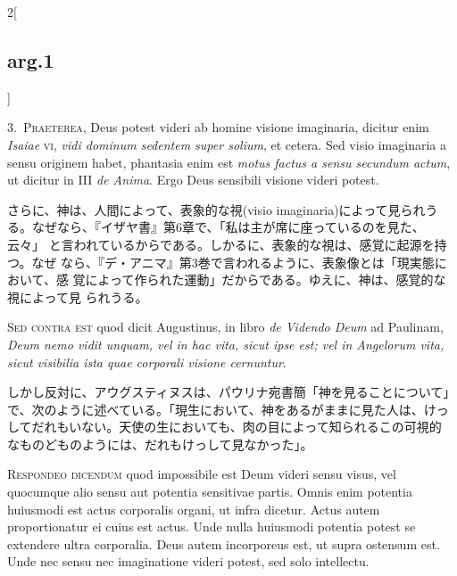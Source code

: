 \documentclass[paper=a4paper,fontsize=10pt,jafontsize=9pt,titlepage]{jlreq}
\begin{document}
\begin{paracol}{2}[\subsection{arg.1}]

3.~{\scshape Praeterea}, Deus potest videri ab homine visione imaginaria,
dicitur enim {\itshape Isaiae} {\scshape vi}, {\itshape vidi dominum sedentem
super solium}, et cetera. Sed visio imaginaria a sensu originem habet,
phantasia enim est {\itshape motus factus a sensu secundum actum}, ut dicitur
in III {\itshape de Anima}. Ergo Deus sensibili visione videri potest.

\switchcolumn

さらに、神は、人間によって、表象的な視(visio imaginaria)によって見られう
る。なぜなら、『イザヤ書』第6章で、「私は主が席に座っているのを見た、云々」
と言われているからである。しかるに、表象的な視は、感覚に起源を持つ。なぜ
なら、『デ・アニマ』第3巻で言われるように、表象像とは「現実態において、感
覚によって作られた運動」だからである。ゆえに、神は、感覚的な視によって見
られうる。

\switchcolumn*[\subsection{s.c.}]

{\scshape Sed contra est} quod dicit Augustinus, in libro {\itshape de Videndo
Deum} ad Paulinam, {\itshape Deum nemo vidit unquam, vel in hac vita, sicut
ipse est; vel in Angelorum vita, sicut visibilia ista quae corporali
visione cernuntur}.

\switchcolumn

しかし反対に、アウグスティヌスは、パウリナ宛書簡「神を見ることについて」
で、次のように述べている。「現生において、神をあるがままに見た人は、けっ
してだれもいない。天使の生においても、肉の目によって知られるこの可視的
なものどものようには、だれもけっして見なかった」。


{\scshape Respondeo dicendum} quod impossibile est Deum videri sensu visus,
 vel quocumque alio sensu aut potentia sensitivae partis. Omnis enim
 potentia huiusmodi est actus corporalis organi, ut infra
 dicetur. Actus autem proportionatur ei cuius est actus. Unde nulla
 huiusmodi potentia potest se extendere ultra corporalia. Deus autem
 incorporeus est, ut supra ostensum est. Unde nec sensu nec
 imaginatione videri potest, sed solo intellectu.


\end{paracol}
\end{document}

